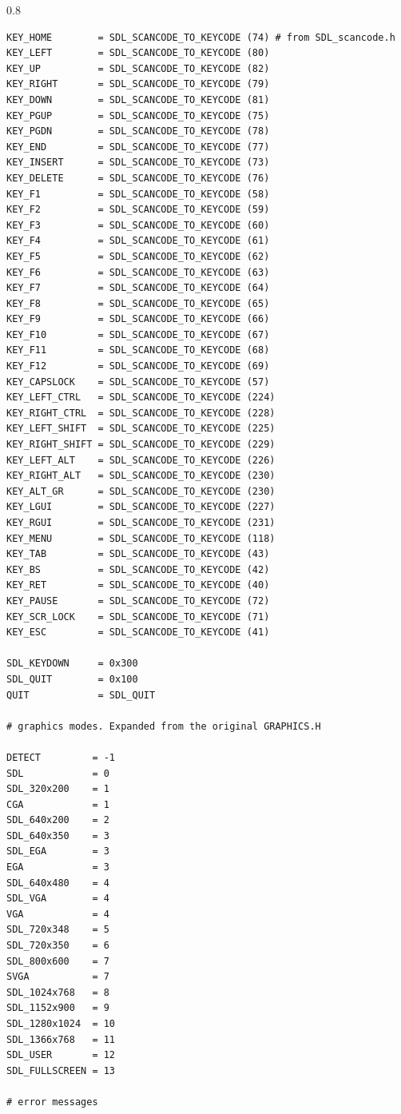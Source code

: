 \documentclass[a4paper,12pt]{article}
\newenvironment{margins}[2]
{ %
\begin{list}{}
{
\setlength{\leftmargin}{#1}
\setlength{\rightmargin}{#2}
} \item
} %
{\end{list}}
\begin{document}
\begin{margins}{-0.5cm}{-0.5cm}
\begin{spacing}{0.8}
\begin{lstlisting}
KEY_HOME        = SDL_SCANCODE_TO_KEYCODE (74) # from SDL_scancode.h
KEY_LEFT        = SDL_SCANCODE_TO_KEYCODE (80)
KEY_UP          = SDL_SCANCODE_TO_KEYCODE (82)
KEY_RIGHT       = SDL_SCANCODE_TO_KEYCODE (79)
KEY_DOWN        = SDL_SCANCODE_TO_KEYCODE (81)
KEY_PGUP        = SDL_SCANCODE_TO_KEYCODE (75)
KEY_PGDN        = SDL_SCANCODE_TO_KEYCODE (78)
KEY_END         = SDL_SCANCODE_TO_KEYCODE (77)
KEY_INSERT      = SDL_SCANCODE_TO_KEYCODE (73)
KEY_DELETE      = SDL_SCANCODE_TO_KEYCODE (76)
KEY_F1          = SDL_SCANCODE_TO_KEYCODE (58)
KEY_F2          = SDL_SCANCODE_TO_KEYCODE (59)
KEY_F3          = SDL_SCANCODE_TO_KEYCODE (60)
KEY_F4          = SDL_SCANCODE_TO_KEYCODE (61)
KEY_F5          = SDL_SCANCODE_TO_KEYCODE (62)
KEY_F6          = SDL_SCANCODE_TO_KEYCODE (63)
KEY_F7          = SDL_SCANCODE_TO_KEYCODE (64)
KEY_F8          = SDL_SCANCODE_TO_KEYCODE (65)
KEY_F9          = SDL_SCANCODE_TO_KEYCODE (66)
KEY_F10         = SDL_SCANCODE_TO_KEYCODE (67)
KEY_F11         = SDL_SCANCODE_TO_KEYCODE (68)
KEY_F12         = SDL_SCANCODE_TO_KEYCODE (69)
KEY_CAPSLOCK    = SDL_SCANCODE_TO_KEYCODE (57)
KEY_LEFT_CTRL   = SDL_SCANCODE_TO_KEYCODE (224)
KEY_RIGHT_CTRL  = SDL_SCANCODE_TO_KEYCODE (228)
KEY_LEFT_SHIFT  = SDL_SCANCODE_TO_KEYCODE (225)
KEY_RIGHT_SHIFT = SDL_SCANCODE_TO_KEYCODE (229)
KEY_LEFT_ALT    = SDL_SCANCODE_TO_KEYCODE (226)
KEY_RIGHT_ALT   = SDL_SCANCODE_TO_KEYCODE (230)
KEY_ALT_GR      = SDL_SCANCODE_TO_KEYCODE (230)
KEY_LGUI        = SDL_SCANCODE_TO_KEYCODE (227)
KEY_RGUI        = SDL_SCANCODE_TO_KEYCODE (231)
KEY_MENU        = SDL_SCANCODE_TO_KEYCODE (118)
KEY_TAB         = SDL_SCANCODE_TO_KEYCODE (43)
KEY_BS          = SDL_SCANCODE_TO_KEYCODE (42)
KEY_RET         = SDL_SCANCODE_TO_KEYCODE (40)
KEY_PAUSE       = SDL_SCANCODE_TO_KEYCODE (72)
KEY_SCR_LOCK    = SDL_SCANCODE_TO_KEYCODE (71)
KEY_ESC         = SDL_SCANCODE_TO_KEYCODE (41)

SDL_KEYDOWN     = 0x300
SDL_QUIT        = 0x100
QUIT            = SDL_QUIT

# graphics modes. Expanded from the original GRAPHICS.H

DETECT         = -1
SDL            = 0
SDL_320x200    = 1
CGA            = 1 
SDL_640x200    = 2
SDL_640x350    = 3
SDL_EGA        = 3
EGA            = 3
SDL_640x480    = 4
SDL_VGA        = 4
VGA            = 4
SDL_720x348    = 5
SDL_720x350    = 6
SDL_800x600    = 7
SVGA           = 7
SDL_1024x768   = 8
SDL_1152x900   = 9
SDL_1280x1024  = 10
SDL_1366x768   = 11
SDL_USER       = 12
SDL_FULLSCREEN = 13

# error messages


\end{lstlisting}
\end{spacing}
\end{margins}
\end{document}
